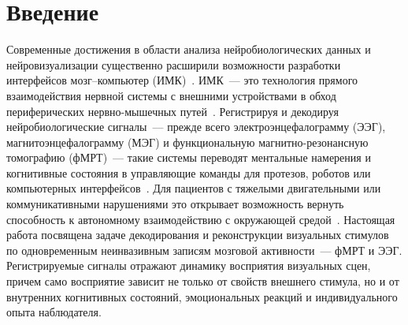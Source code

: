\cleardoublepage
{}
{}
\section*{Введение}

Современные достижения в области анализа нейробиологических данных и нейровизуализации существенно расширили возможности разработки интерфейсов мозг--компьютер (ИМК)~\cite{wolpaw2000brain, makeig2004mining}. ИМК~--- это технология прямого взаимодействия нервной системы с внешними устройствами в обход периферических нервно-мышечных путей~\cite{mcfarland2002brain}. Регистрируя и декодируя нейробиологические сигналы~--- прежде всего электроэнцефалограмму (ЭЭГ), магнитоэнцефалограмму (МЭГ) и функциональную магнитно-резонансную томографию (фМРТ)~--- такие системы переводят ментальные намерения и когнитивные состояния в управляющие команды для протезов, роботов или компьютерных интерфейсов~\cite{song2020assistive, cruz2021self, dorin2025enhancing}. Для пациентов с тяжелыми двигательными или коммуникативными нарушениями это открывает возможность вернуть способность к автономному взаимодействию с окружающей средой~\cite{schwarz2020decoding}. Настоящая работа посвящена задаче декодирования и реконструкции визуальных стимулов по одновременным неинвазивным записям мозговой активности~--- фМРТ и ЭЭГ. Регистрируемые сигналы отражают динамику восприятия визуальных сцен, причем само восприятие зависит не только от свойств внешнего стимула, но и от внутренних когнитивных состояний, эмоциональных реакций и индивидуального опыта наблюдателя.

